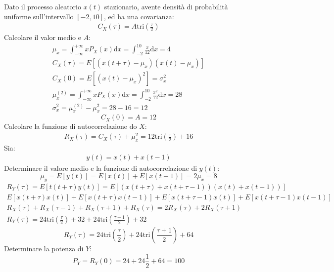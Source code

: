 \documentclass{article}
\newcommand{\df}{\mathrm{d}}
\begin{document}
Dato il processo aleatorio $x(t)$ stazionario, avente densità di probabilità uniforme sull'intervallo $[-2,10]$, ed  
ha una covarianza:
\begin{gather*}
    C_X(\tau)=A\mathrm{tri}\displaystyle\left(\frac{\tau}{2}\right)
\end{gather*}
Calcolare il valor medio e $A$:
\begin{gather*}
    \mu_x=\displaystyle\int_{-\infty}^{+\infty}xP_X(x)\df x=\int_{-2}^{10}\frac{x}{12}\df x=4\\
    C_X(\tau)=E[(x(t+\tau)-\mu_x)(x(t)-\mu_x)]\\
    C_X(0)=E[(x(t)-\mu_x)^2]=\sigma_x^2\\
    \mu_x^{(2)}=\displaystyle\int_{-\infty}^{+\infty}xP_X(x)\df x=\int_{-2}^{10}\frac{x^2}{12}\df x=28\\
    \sigma_x^2=\mu_x^{(2)}-\mu_x^2=28-16=12
\end{gather*}
\begin{equation}
    C_X(0)=A=12
\end{equation}
Calcolare la funzione di autocorrelazione do $X$:
\begin{gather}
    R_X(\tau)=C_X(\tau)+\mu_x^2=12\mathrm{tri}\displaystyle\left(\frac{\tau}{2}\right)+16
\end{gather}
Sia: 
\begin{gather*}
    y(t)=x(t)+x(t-1)
\end{gather*}
Determinare il valore medio e la funzione di autocorrelazione di $y(t)$:
\begin{equation}
    \mu_y=E[y(t)]=E[x(t)]+E[x(t-1)]=2\mu_x=8
\end{equation}
\begin{gather*}
    R_Y(\tau)=E[t(t+\tau)y(t)]=E[(x(t+\tau)+x(t+\tau-1))(x(t)+x(t-1))]\\
    E[x(t+\tau)x(t)]+E[x(t+\tau)x(t-1)]+E[x(t+\tau-1)x(t)]+E[x(t+\tau-1)x(t-1)]\\
    R_X(\tau)+R_X(\tau-1)+R_X(\tau+1)+R_X(\tau)=2R_X(\tau)+2R_X(\tau+1)\\
    R_Y(\tau)=24\mathrm{tri}\displaystyle\left(\frac{\tau}{2}\right)+32+24\mathrm{tri}\left(\frac{\tau+1}{2}\right)+32
\end{gather*}
\begin{equation}
    R_Y(\tau)=24\mathrm{tri}\displaystyle\left(\frac{\tau}{2}\right)+24\mathrm{tri}\left(\frac{\tau+1}{2}\right)+64
\end{equation}
Determinare la potenza di $Y$:
\begin{equation}
    P_Y=R_Y(0)=24+24\displaystyle\frac{1}{2}+64=100    
\end{equation}
\end{document}
